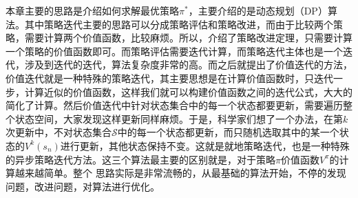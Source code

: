\documentclass[a4paper]{article}
\begin{document}
本章主要的思路是介绍如何求解最优策略$\pi^\ast$，主要介绍的是动态规划（DP）算法。其中策略迭代主要的思路可以分成策略评估和策略改进，而由于比较两个策略，需要计算两个价值函数，比较麻烦。所以，介绍了策略改进定理，只需要计算一个策略的价值函数即可。而策略评估需要迭代计算，而策略迭代主体也是一个迭代，涉及到迭代的迭代，算法复杂度非常的高。而之后就提出了价值迭代的方法，价值迭代就是一种特殊的策略迭代，其主要思想是在计算价值函数时，只迭代一步，计算近似的价值函数，这样我们就可以构建价值函数之间的迭代公式，大大的简化了计算。然后价值迭代中针对状态集合中的每一个状态都要更新，需要遍历整个状态空间，大家发现这样更新同样麻烦。于是，科学家们想了一个办法，在第$k$次更新中，不对状态集合$\mathcal{S}$中的每一个状态都更新，而只随机选取其中的某一个状态的$V^k({s_n})$进行更新，其他状态保持不变。这就是就地策略迭代，也是一种特殊的异步策略迭代方法。这三个算法最主要的区别就是，对于策略$\pi$价值函数$V^\pi$的计算越来越简单。整个
思路实际是非常流畅的，从最基础的算法开始，不停的发现问题，改进问题，对算法进行优化。
\end{document}
